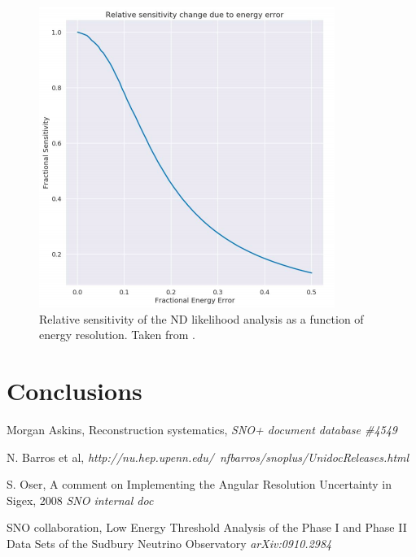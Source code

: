 \documentclass[]{article}
\begin{document}
\begin{figure}\centering
	\includegraphics[scale=0.8]{plots/Energy} 
	\caption{Relative sensitivity of the ND likelihood analysis as a function of energy resolution. Taken from \cite{MorganTalk}.}
	\label{fig:energy}
\end{figure}

\section{Conclusions}

\begin{thebibliography}{9}
	Morgan Askins,
	Reconstruction systematics, 
	\textit{SNO+ document database \#4549}
	
	N. Barros et al,
	\textit{http://nu.hep.upenn.edu/~nfbarros/snoplus/UnidocReleases.html}
	
	S. Oser,
	A comment on Implementing the Angular Resolution Uncertainty in Sigex, 2008
	\textit{SNO internal doc}
	
	SNO collaboration,
	Low Energy Threshold Analysis of the Phase I and Phase II Data Sets of the Sudbury Neutrino Observatory
	\textit{arXiv:0910.2984}
\end{thebibliography}
\end{document}
